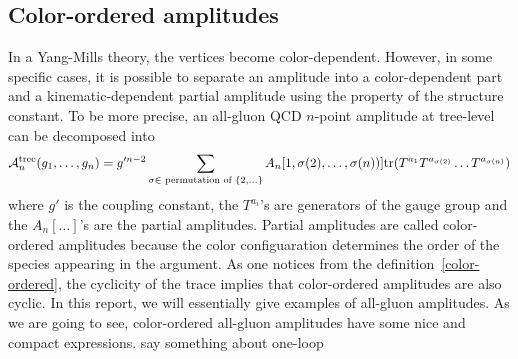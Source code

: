 \subsection*{Color-ordered amplitudes}
In a Yang-Mills theory, the vertices become color-dependent. 
However, in some specific cases, it is possible to separate an amplitude into 
a color-dependent part and a kinematic-dependent partial amplitude using the property of the structure constant.
To be more precise, an all-gluon QCD $n$-point amplitude at tree-level can be decomposed into~\cite{MANGANO1988461}
\begin{equation}\label{color-ordered}
\mathcal{A}_n^{\mathrm{tree}}(g_1, \ldots, g_n) = g'^{n-2}\sum_{\sigma\in\textrm{ permutation of }\{2,\ldots\}} A_n[1,\sigma(2),\ldots,\sigma(n))]\mathrm{tr}(T^{a_1} T^{a_{\sigma(2)}}\ldots T^{a_{\sigma(n)}})
\end{equation}
where $g'$ is the coupling constant, the $T^{a_i}$'s are generators of the gauge group and the $A_n[\ldots]$'s are the partial amplitudes.
Partial amplitudes are called color-ordered amplitudes because the color configuaration determines the order of the species appearing in the argument.
As one notices from the definition~\cref{color-ordered}, the cyclicity of the trace implies that color-ordered amplitudes are also cyclic. 
In this report, we will essentially give examples of all-gluon amplitudes.
As we are going to see, color-ordered all-gluon amplitudes have some nice and compact expressions.
\color{red} say something about one-loop\color{black}
%
%
